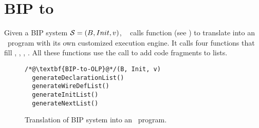 \section{BIP to \caig}
\label{sec:bip2aig}
%
Given a BIP system $\mathcal{S} = (B, Init, v)$, \biptool~
calls function  (see ) to translate \Pm into 
an \caig~program with its own customized execution engine. 
It calls four functions that fill , , , . 
All these functions use the  call to add code fragments to lists. 
%
\begin{figure}
\begin{lstlisting}
/*@\textbf{BIP-to-OLP}@*/(B, Init, v)
  generateDeclarationList()
  generateWireDefList()
  generateInitList()
  generateNextList()
\end{lstlisting}
\caption{Translation of BIP system into an \caig~program.}
\label{fig:bip-to-abc-function}
\end{figure}
%

